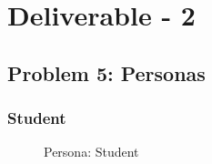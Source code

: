 \documentclass[a4paper,12pt]{report}
\begin{document}

\newpage

\tableofcontents




\chapter*{\centering Deliverable - 2}

\vspace{1cm}
\section{Problem 5: Personas \cite{usermodelingkamthan}}

\FloatBarrier
\subsection{Student}
\begin{figure}[!htb]
	\caption{\label{fig:persona_student}Persona: Student}	
\end{figure}
\end{document}
